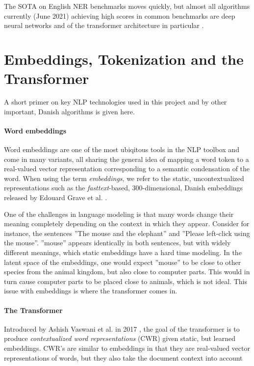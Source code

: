 \documentclass[main.tex]{subfiles}
\begin{document}
The SOTA on English NER benchmarks moves quickly, but almost all algorithms currently (June 2021) achieving high scores in common benchmarks are deep neural networks and of the transformer architecture in particular \cite{ruder21ner, pwc21ner}.

\section{Embeddings, Tokenization and the Transformer}
\label{sec:transformers}
A short primer on key NLP technologies used in this project and by other important, Danish algorithms is given here.
\paragraph{Word embeddings}
Word embeddings are one of the most ubiqitous tools in the NLP toolbox and come in many variants, all sharing the general idea of mapping a word token to a real-valued vector representation corresponding to a semantic condensation of the word.
When using the term \emph{embeddings}, we refer to the static, uncontextualized representations such as the \emph{fasttext}-based, 300-dimensional, Danish embeddings released by Edouard Grave et al. \cite{grave2018learning}.

One of the challenges in language modeling is that many words change their meaning completely depending on the context in which they appear.
Consider for instance, the sentences ''The mouse and the elephant'' and ''Please left-click using the mouse''.
''mouse'' appears identically in both sentences, but with widely different meanings, which static embeddings have a hard time modeling.
In the latent space of the embeddings, one would expect ''mouse'' to be close to other species from the animal kingdom, but also close to computer parts.
This would in turn cause computer parts to be placed close to animals, which is not ideal.
This issue with embeddings is where the transformer comes in.

\paragraph{The Transformer}
Introduced by Ashish Vaswani et al. in 2017 \cite{vaswani2017att}, the goal of the transformer is to produce \emph{contextualized word representations} (CWR) given static, but learned embeddings.
CWR's are similar to embeddings in that they are real-valued vector representations of words, but they also take the document context into account
\end{document}
